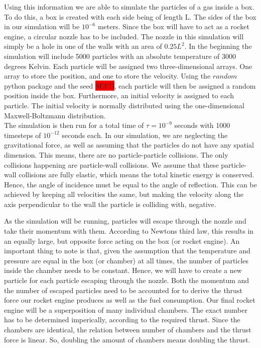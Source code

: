 \documentclass[reprint,english,notitlepage]{revtex4-2}
\begin{document}
Using this information we are able to simulate the particles of a gas inside a box.
To do this, a box is created with each side being of length L. The sides of the box in our simulation will be $10^{-6}$ meters.
Since the box will have to act as a rocket engine, a circular nozzle has to be included.
The nozzle in this simulation will simply be a hole in one of the walls with an area of $0.25L^{2}$.
In the beginning the simulation will include 5000 particles with an absolute temperature of 3000 degrees Kelvin.
Each particle will be assigned two three-dimensional arrays. One array to store the position, and one to store the velocity.
Using the $random$ python package and the seed \colorbox{red}{SEED}, each particle will then be assigned a random position inside the box.
Furthermore, an initial velocity is assigned to each particle. The initial velocity is normally distributed using the one-dimensional Maxwell-Boltzmann distribution.\\
The simulation is then run for a total time of $\tau = 10^{-9}$ seconds with 1000 timesteps of $10^{-12}$ seconds each.
In our simulation, we are neglecting the gravitational force, as well as assuming that the particles do not have any spatial dimension.
This means, there are no particle-particle collisions. The only collisions happening are particle-wall collisions.
We assume that these particle-wall collisions are fully elastic, which means the total kinetic energy is conserved.
Hence, the angle of incidence must be equal to the angle of reflection.
This can be achieved by keeping all velocities the same, but making the velocity along the axis perpendicular to the wall the particle is colliding with, negative.

As the simulation will be running, particles will escape through the nozzle and take their momentum with them.
According to Newtons third law, this results in an equally large, but opposite force acting on the box (or rocket engine).
An important thing to note is that, given the assumption that the temperature and pressure are equal in the box (or chamber) at all times, the number of particles inside the chamber needs to be constant.
Hence, we will have to create a new particle for each particle escaping through the nozzle.
Both the momentum and the number of escaped particles need to be accounted for to derive the thrust force our rocket engine produces as well as the fuel consumption.
Our final rocket engine will be a superposition of many individual chambers. The exact number has to be determined imperically, according to the required thrust.
Since the chambers are identical, the relation between number of chambers and the thrust force is linear.
So, doubling the amount of chambers means doubling the thrust.
\end{document}
